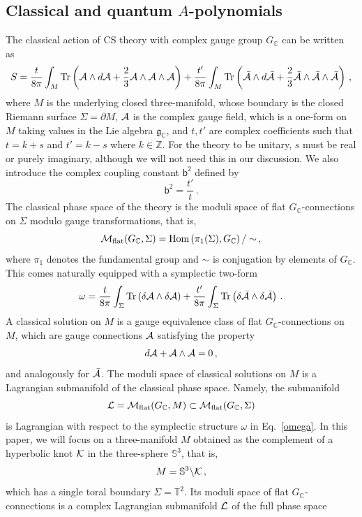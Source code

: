 \documentclass[a4paper,11pt]{article}
\theoremstyle{definition}
\newcommand{\CA}{{\cal A}}
\newcommand{\CK}{{\cal K}}
\newcommand{\CL}{{\cal L}}
\newcommand{\CM}{{\cal M}}
\def\IZ{{\mathbb Z}}
\def\IC{{\mathbb C}}
\def\IT{{\mathbb T}}
\def\IS{{\mathbb S}}
\newcommand{\tr}{{\rm Tr}}
\renewcommand{\d}{\partial}
\def\Hom{{\rm Hom}}
\newcommand{\mb}{{\mathsf{b}}}
\newcommand{\be}{\begin{equation}}
\newcommand{\ee}{\end{equation}}
\begin{document}
\subsection{Classical and quantum $A$-polynomials} \label{sec: Apoly}
The classical action of CS theory with complex gauge group $G_{\IC}$ can be written as~\cite{witten91}
%
\be
S = \frac{t}{8 \pi} \int_M \tr\left(\CA \wedge d\CA + \frac{2}{3} \CA \wedge \CA \wedge \CA \right) +  \frac{t'}{8 \pi} \int_M \tr\left(\bar{\CA} \wedge d\bar{\CA} + \frac{2}{3} \bar{\CA} \wedge \bar{\CA} \wedge \bar{\CA} \right) \, ,
\ee 
%
where $M$ is the underlying closed three-manifold, whose boundary is the 
closed Riemann surface $\Sigma = \d M$, $\CA$ is the complex gauge field, which is a one-form on $M$ taking values in the Lie algebra $\mathfrak{g}_{\IC}$, and $t, t'$ are complex coefficients such that $t=k+s$ and $t'=k-s$ where $k \in \IZ$. For the theory to be unitary, $s$ must be real or purely imaginary, although we will not need this in our discussion. We also introduce the complex coupling constant $\mb^2$ defined by
%
\be
\mb^2= \frac{t'}{t} \, . 
\ee
%
The classical phase space of the theory is the moduli space of flat $G_{\IC}$-connections on $\Sigma$ modulo gauge transformations, that is, 
\be \label{phase_space}
\CM_{\rm{flat}} (G_{\IC}, \Sigma) = \Hom\left(\pi_1(\Sigma), G_{\IC} \right) / \sim \, ,
\ee
where $\pi_1$ denotes the fundamental group and $\sim$ is conjugation by elements of $G_{\IC}$. This comes naturally equipped with a symplectic two-form
\be \label{omega}
\omega = \frac{t}{8 \pi} \int_{\Sigma} \tr\left(\delta \CA \wedge \delta \CA \right) + \frac{t'}{8 \pi} \int_{\Sigma} \tr\left(\delta \bar{\CA} \wedge \delta \bar{\CA} \right) \, .
\ee
%
A classical solution on $M$ is a gauge equivalence class of flat $G_{\IC}$-connections on $M$, which are gauge connections $\CA$ satisfying the property
\be
d \CA + \CA \wedge \CA = 0 \, ,
\ee
and analogously for $\bar{\CA}$. The moduli space of classical solutions on $M$ is a Lagrangian submanifold of the classical phase space.
Namely, the submanifold
\be
\CL = \CM_{\rm{flat}} (G_{\IC}, M) \subset \CM_{\rm{flat}} (G_{\IC}, \Sigma) 
\ee
is Lagrangian with respect to the symplectic structure $\omega$ in Eq.~\eqref{omega}.
%
In this paper, we will focus on a three-manifold $M$ obtained as the complement of a hyperbolic knot $\CK$ in the three-sphere $\IS^3$, that is,
%
\be
\label{MK}
M = \IS^3 \backslash \CK \, ,
\ee
which has a single toral boundary $\Sigma = \IT^2$. Its moduli space of flat $G_{\IC}$-connections is a complex Lagrangian submanifold $\CL$ of the full phase space
\end{document}
